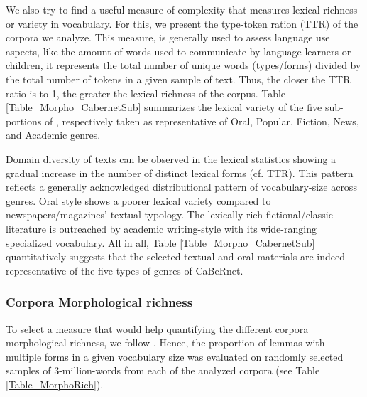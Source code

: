 We also try to find a useful measure of complexity that measures lexical richness or variety in vocabulary. For this, we present the type-token ration (TTR) of the corpora we analyze. This measure, is generally used to assess language use aspects, like the amount of words used to communicate by language learners or children, it represents the total number of unique words (types/forms) divided by the total number of tokens in a given sample of text. Thus, the closer the TTR ratio is to 1, the greater the lexical richness of the corpus. Table \ref{Table_Morpho_CabernetSub} summarizes the lexical variety of the five sub-portions of \Cabernet, respectively taken as representative of Oral, Popular, Fiction, News, and Academic genres.

Domain diversity of texts can be observed in the lexical statistics showing a gradual increase in the number of distinct lexical forms (cf. TTR). This pattern  reflects a generally acknowledged distributional pattern of vocabulary-size across genres. Oral style shows a poorer lexical variety compared to newspapers/magazines’ textual typology. The lexically rich fictional/classic literature is outreached by academic writing-style with its wide-ranging specialized vocabulary. All in all, Table \ref{Table_Morpho_CabernetSub} quantitatively suggests that the selected textual and oral materials are indeed representative of the five types of genres of CaBeRnet.

\subsubsection{Corpora Morphological richness}

To select a measure that would help quantifying the different corpora morphological richness, we follow \citep{bonami-etal-2015-implicative}. Hence, the proportion of lemmas with multiple forms in a given vocabulary size was evaluated on randomly selected samples of 3-million-words from each of the analyzed corpora (see Table \ref{Table_MorphoRich}).

